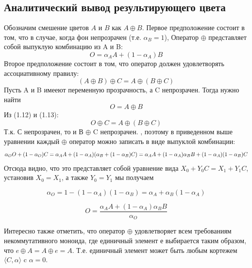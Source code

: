 \subsection{Аналитический вывод результирующего цвета}
Обозначим смешение цветов $A$ и $B$ как $A \oplus B$. 
Первое предположение состоит в том, что в случае, когда фон непрозрачен (т.е. $\alpha _ {B} = 1$), Оператор $\oplus$ представляет собой выпуклую комбинацию из A и B:
\begin{equation}
O= \alpha_{A}A + (1- \alpha_{A})B
\end{equation}
Второе предположение состоит в том, что оператор должен удовлетворять ассоциативному правилу:
\begin{equation}
(A \oplus B) \oplus C = A \oplus (B \oplus C)
\end{equation}
Пусть A и B имееют переменную прозрачность, а C непрозрачен. Тогда нужно найти
\begin{equation}
O = A \oplus B
\end{equation}
Из (1.12) и (1.13):
\begin{equation}
O \oplus C = A \oplus (B \oplus C)
\end{equation}
Т.к. С непрозрачен, то и В $\oplus$ C непрозрачен. , поэтому в приведенном выше уравнении каждый  $\oplus$ оператор можно записать в виде выпуклой комбинации:
\begin{equation}
\alpha_{O}O + (1 - \alpha_{O}) C = \alpha_{A}A + (1 - \alpha_{A})(\alpha_{B} + (1 - \alpha_{B})C) \\
= \alpha_{A}A + (1 - \alpha_{A})\alpha_{B}B + (1-\alpha_{A})(1-\alpha_{B})C
\end{equation}
Отсюда видно, что это представляет собой уравнение вида $ X_{0} + Y_{0} C = X_{1} + Y_{1} C$, установив  $X_{0} = X_{1}$, а также $Y_{0} = Y_ {1}$ мы получаем

\begin{equation}
\alpha_{O} = 1 - (1 - \alpha_{A})(1 - \alpha_{B}) =  \alpha_{A} + \alpha_{B}(1-\alpha_{A})
\end{equation}

\begin{equation}
O = \frac{\alpha_{A}A + (1-\alpha_{A})\alpha_{B}B}{\alpha_{O}}
\end{equation}

Интересно также отметить, что оператор  $\oplus$ удовлетворяет всем требованиям некоммутативного моноида, где единичный элемент $е$ выбирается таким образом, что  $e\oplus A = A \oplus e = A$. Т.е. единичный элемент может быть любым кортежем $\langle C, \alpha \rangle$ c $\alpha = 0$.

